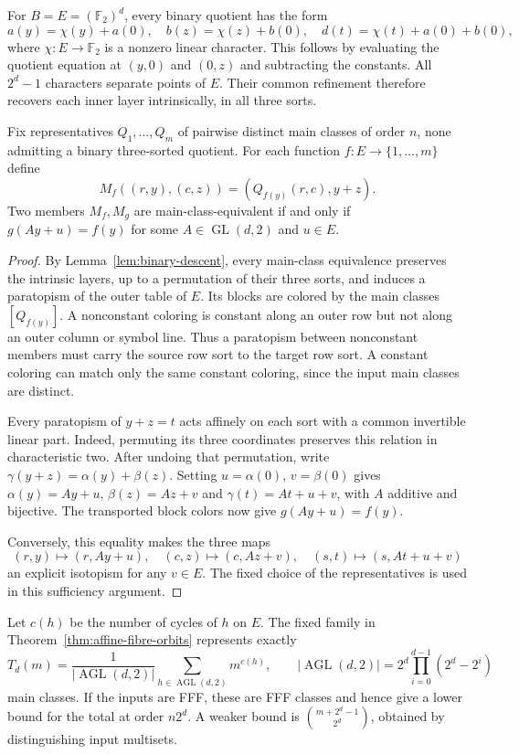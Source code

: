 For $B=E=(\mathbb F_2)^d$, every binary quotient has the form
\[
 a(y)=\chi(y)+a(0),\quad b(z)=\chi(z)+b(0),\quad
 d(t)=\chi(t)+a(0)+b(0),
\]
where $\chi:E\to\mathbb F_2$ is a nonzero linear character. This follows
by evaluating the quotient equation at $(y,0)$ and $(0,z)$ and
subtracting the constants. All $2^d-1$ characters separate points
of $E$. Their common refinement therefore recovers each inner
layer intrinsically, in all three sorts.

\begin{theorem}
\label{thm:affine-fibre-orbits}
Fix representatives $Q_1,\ldots,Q_m$ of pairwise distinct main
classes of order $n$, none admitting a binary three-sorted quotient.
For each function $f:E\to\{1,\ldots,m\}$ define
\[
 M_f((r,y),(c,z))=(Q_{f(y)}(r,c),y+z).
\]
Two members $M_f,M_g$ are main-class-equivalent if and only if
$g(Ay+u)=f(y)$ for some $A\in\operatorname{GL}(d,2)$ and $u\in E$.
\end{theorem}

\begin{proof}
By Lemma~\ref{lem:binary-descent}, every main-class equivalence
preserves the intrinsic layers, up to a permutation of their three
sorts, and induces a paratopism of the outer table of $E$. Its
blocks are colored by the main classes $[Q_{f(y)}]$. A nonconstant
coloring is constant along an outer row but not along an outer
column or symbol line. Thus a paratopism between nonconstant members
must carry the source row sort to the target row sort. A constant
coloring can match only the same constant coloring, since the input
main classes are distinct.

Every paratopism of $y+z=t$ acts affinely on each sort with a
common invertible linear part. Indeed, permuting its three coordinates
preserves this relation in characteristic two. After undoing that
permutation, write $\gamma(y+z)=\alpha(y)+\beta(z)$. Setting
$u=\alpha(0)$, $v=\beta(0)$ gives
$\alpha(y)=Ay+u$, $\beta(z)=Az+v$ and
$\gamma(t)=At+u+v$, with $A$ additive and bijective.
The transported block colors now give $g(Ay+u)=f(y)$.

Conversely, this equality makes the three maps
\[
 (r,y)\mapsto(r,Ay+u),\quad(c,z)\mapsto(c,Az+v),\quad
 (s,t)\mapsto(s,At+u+v)
\]
an explicit isotopism for any $v\in E$. The fixed choice of the
representatives is used in this sufficiency argument.
\end{proof}

\begin{corollary}
\label{cor:affine-class-count}
Let $c(h)$ be the number of cycles of $h$ on $E$. The fixed family
in Theorem~\ref{thm:affine-fibre-orbits} represents exactly
\begin{equation}
 T_d(m)=\frac{1}{|\operatorname{AGL}(d,2)|}
          \sum_{h\in\operatorname{AGL}(d,2)}m^{c(h)},\qquad
 |\operatorname{AGL}(d,2)|=2^d\prod_{i=0}^{d-1}(2^d-2^i)
 \label{eq:burnside-fibres}
\end{equation}
main classes. If the inputs are FFF, these are FFF classes and hence
give a lower bound for the total at order $n2^d$. A weaker bound is
$\binom{m+2^d-1}{2^d}$, obtained by distinguishing input multisets.
\end{corollary}

